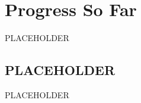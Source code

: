 \chapter{Progress So Far}\label{ch:progress-so-far}

PLACEHOLDER

\section{PLACEHOLDER}

PLACEHOLDER

